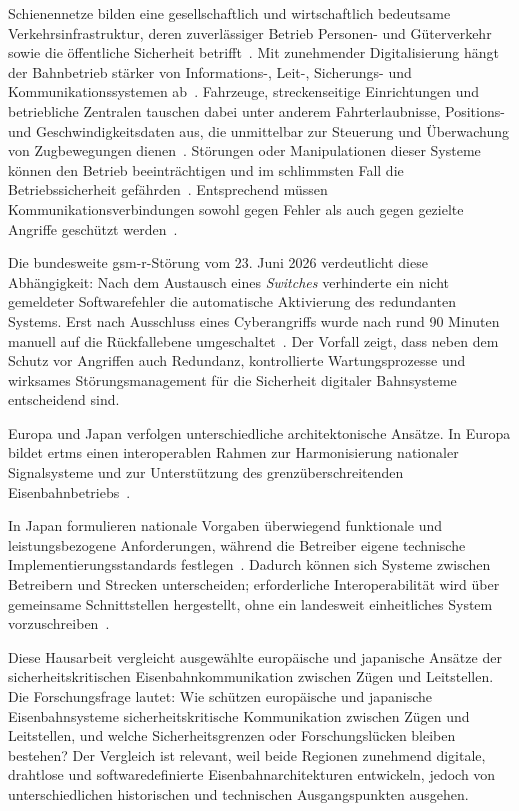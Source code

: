 \documentclass[runningheads]{res/llncs}
\begin{document}
Schienennetze bilden eine gesellschaftlich und wirtschaftlich bedeutsame Verkehrsinfrastruktur, deren zuverlässiger Betrieb Personen- und Güterverkehr sowie die öffentliche Sicherheit betrifft~\parencite[S. 4]{xiangliuCyber2020}. Mit zunehmender Digitalisierung hängt der Bahnbetrieb stärker von Informations-, Leit-, Sicherungs- und Kommunikationssystemen ab~\parencite[S. 3–4]{xiangliuCyber2020}. Fahrzeuge, streckenseitige Einrichtungen und betriebliche Zentralen tauschen dabei unter anderem Fahrterlaubnisse, Positions- und Geschwindigkeitsdaten aus, die unmittelbar zur Steuerung und Überwachung von Zugbewegungen dienen~\parencite[S. 88, 106, 163–166]{trinckaufETCS2024}. Störungen oder Manipulationen dieser Systeme können den Betrieb beeinträchtigen und im schlimmsten Fall die Betriebssicherheit gefährden~\parencite[S. 204, 207]{trinckaufETCS2024}. Entsprechend müssen Kommunikationsverbindungen sowohl gegen Fehler als auch gegen gezielte Angriffe geschützt werden~\parencite[S. 204]{trinckaufETCS2024}. 

Die bundesweite \gls{gsm-r}-Störung vom 23. Juni 2026 verdeutlicht diese Abhängigkeit: Nach dem Austausch eines \textit{Switches} verhinderte ein nicht gemeldeter Softwarefehler die automatische Aktivierung des redundanten Systems. Erst nach Ausschluss eines Cyberangriffs wurde nach rund 90 Minuten manuell auf die Rückfallebene umgeschaltet~\cite{dbinfragoUrsacheZugfunkStoerung2026}. Der Vorfall zeigt, dass neben dem Schutz vor Angriffen auch Redundanz, kontrollierte Wartungsprozesse und wirksames Störungsmanagement für die Sicherheit digitaler Bahnsysteme entscheidend sind.

Europa und Japan verfolgen unterschiedliche architektonische Ansätze. In Europa bildet \gls{ertms} einen interoperablen Rahmen zur Harmonisierung nationaler Signalsysteme und zur Unterstützung des grenzüberschreitenden Eisenbahnbetriebs~\cite{EuropeanCommission_ERTMS_2026}. 

In Japan formulieren nationale Vorgaben überwiegend funktionale und leistungsbezogene Anforderungen, während die Betreiber eigene technische Implementierungsstandards festlegen~\cite{yanaseJapanese2011}. Dadurch können sich Systeme zwischen Betreibern und Strecken unterscheiden; erforderliche Interoperabilität wird über gemeinsame Schnittstellen hergestellt, ohne ein landesweit einheitliches System vorzuschreiben~\cite{MLIT_CBTC_2021}.

Diese Hausarbeit vergleicht ausgewählte europäische und japanische Ansätze der sicherheitskritischen Eisenbahnkommunikation zwischen Zügen und Leitstellen. Die Forschungsfrage lautet: Wie schützen europäische und japanische Eisenbahnsysteme sicherheitskritische Kommunikation zwischen Zügen und Leitstellen, und welche Sicherheitsgrenzen oder Forschungslücken bleiben bestehen? Der Vergleich ist relevant, weil beide Regionen zunehmend digitale, drahtlose und softwaredefinierte Eisenbahnarchitekturen entwickeln, jedoch von unterschiedlichen historischen und technischen Ausgangspunkten ausgehen.
\end{document}
